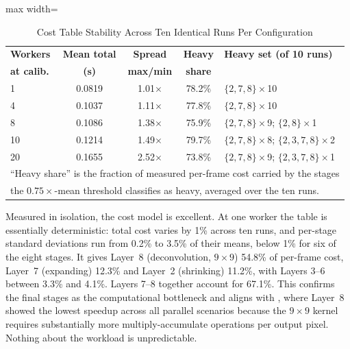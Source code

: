 \documentclass[conference]{IEEEtran}
\begin{document}
\begin{table}[htbp]
\caption{Cost Table Stability Across Ten Identical Runs Per Configuration}
\begin{center}
\small
\begin{adjustbox}{max width=\columnwidth}
\begin{tabular}{|l|c|c|c|l|}
\hline
\textbf{Workers} & \textbf{Mean total} & \textbf{Spread} & \textbf{Heavy} & \textbf{Heavy set (of 10 runs)} \\
\textbf{at calib.} & \textbf{(s)} & \textbf{max/min} & \textbf{share} & \\
\hline
1  & 0.0819 & 1.01$\times$ & 78.2\% & $\{2,7,8\}\times$10 \\
4  & 0.1037 & 1.11$\times$ & 77.8\% & $\{2,7,8\}\times$10 \\
8  & 0.1086 & 1.38$\times$ & 75.9\% & $\{2,7,8\}\times$9; $\{2,8\}\times$1 \\
10 & 0.1214 & 1.49$\times$ & 79.7\% & $\{2,7,8\}\times$8; $\{2,3,7,8\}\times$2 \\
20 & 0.1655 & 2.52$\times$ & 73.8\% & $\{2,7,8\}\times$9; $\{2,3,7,8\}\times$1 \\
\hline
\multicolumn{5}{l}{\footnotesize ``Heavy share'' is the fraction of measured per-frame cost carried by the stages}\\
\multicolumn{5}{l}{\footnotesize the $0.75\times$-mean threshold classifies as heavy, averaged over the ten runs.}\\
\end{tabular}
\end{adjustbox}
\label{tab:layers}
\end{center}
\end{table}

Measured in isolation, the cost model is excellent. At one worker the table is essentially deterministic: total cost varies by 1\% across ten runs, and per-stage standard deviations run from 0.2\% to 3.5\% of their means, below 1\% for six of the eight stages. It gives Layer~8 (deconvolution, $9\times9$) 54.8\% of per-frame cost, Layer~7 (expanding) 12.3\% and Layer~2 (shrinking) 11.2\%, with Layers 3--6 between 3.3\% and 4.1\%. Layers 7--8 together account for 67.1\%. This confirms the final stages as the computational bottleneck and aligns with \cite{annisa2025fsrcnn}, where Layer~8 showed the lowest speedup across all parallel scenarios because the $9\times9$ kernel requires substantially more multiply-accumulate operations per output pixel. Nothing about the workload is unpredictable.
\end{document}
